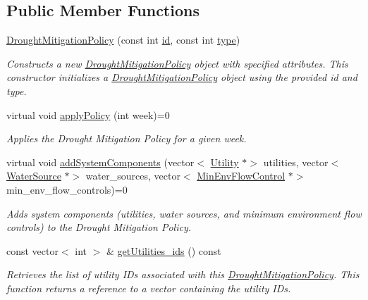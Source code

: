 \subsection*{Public Member Functions}
\begin{DoxyCompactItemize}
\item 
\mbox{\hyperlink{classDroughtMitigationPolicy_a00cce0117a5bc0c446727e0c0c59a8df}{Drought\+Mitigation\+Policy}} (const int \mbox{\hyperlink{classDroughtMitigationPolicy_abf3ed19ed98e0d74dc9ae24094be640b}{id}}, const int \mbox{\hyperlink{classDroughtMitigationPolicy_aaea5016d1462bec889cb8df85aececc6}{type}})
\begin{DoxyCompactList}\small\item\em Constructs a new \mbox{\hyperlink{classDroughtMitigationPolicy}{Drought\+Mitigation\+Policy}} object with specified attributes. This constructor initializes a \mbox{\hyperlink{classDroughtMitigationPolicy}{Drought\+Mitigation\+Policy}} object using the provided {\ttfamily id} and {\ttfamily type}. \end{DoxyCompactList}\item 
virtual void \mbox{\hyperlink{classDroughtMitigationPolicy_a76c1a85eaf7707306fe173b6437cc31d}{apply\+Policy}} (int week)=0
\begin{DoxyCompactList}\small\item\em Applies the Drought Mitigation Policy for a given week. \end{DoxyCompactList}\item 
virtual void \mbox{\hyperlink{classDroughtMitigationPolicy_aaab042a79d781afe8e08753b7012372a}{add\+System\+Components}} (vector$<$ \mbox{\hyperlink{classUtility}{Utility}} $\ast$$>$ utilities, vector$<$ \mbox{\hyperlink{classWaterSource}{Water\+Source}} $\ast$$>$ water\+\_\+sources, vector$<$ \mbox{\hyperlink{classMinEnvFlowControl}{Min\+Env\+Flow\+Control}} $\ast$$>$ min\+\_\+env\+\_\+flow\+\_\+controls)=0
\begin{DoxyCompactList}\small\item\em Adds system components (utilities, water sources, and minimum environment flow controls) to the Drought Mitigation Policy. \end{DoxyCompactList}\item 
const vector$<$ int $>$ \& \mbox{\hyperlink{classDroughtMitigationPolicy_a4c3940352b0092e6a4f673f72693d239}{get\+Utilities\+\_\+ids}} () const
\begin{DoxyCompactList}\small\item\em Retrieves the list of utility I\+Ds associated with this \mbox{\hyperlink{classDroughtMitigationPolicy}{Drought\+Mitigation\+Policy}}. This function returns a reference to a vector containing the utility I\+Ds. \end{DoxyCompactList}\item 
$$
\end{DoxyCompactItemize}
